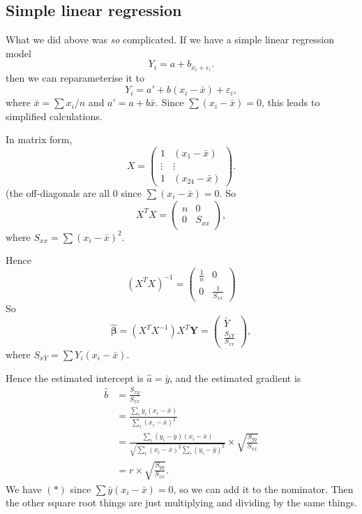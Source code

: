\documentclass[a4paper]{article}
\begin{document}
\subsection{Simple linear regression}
What we did above was \emph{so} complicated. If we have a simple linear regression model
\[
  Y_i = a + b_{x_i + \varepsilon_i}.
\]
then we can reparameterise it to
\[
  Y_i = a' + b(x_i - \bar x) + \varepsilon_i,\tag{6}
\]
where $\bar x = \sum x_i/n$ and $a' = a + b\bar x$. Since $\sum (x_i - \bar x) = 0$, this leads to simplified calculations.

In matrix form,
\[
  X =
  \begin{pmatrix}
    1 & (x_1 - \bar x)\\
    \vdots & \vdots \\
    1 & (x_{24} - \bar x)
  \end{pmatrix}.
\]
(the off-diagonals are all 0 since $\sum (x_i - \bar x) = 0$. So
\[
  X^TX =
  \begin{pmatrix}
    n & 0\\
    0 & S_{xx}
  \end{pmatrix},
\]
where $S_{xx} = \sum (x_i - \bar x)^2$.

Hence
\[
  (X^TX)^{-1} =
  \begin{pmatrix}
    \frac{1}{n} & 0\\
    0 & \frac{1}{S_{xx}}
  \end{pmatrix}
\]
So
\[
  \hat{\boldsymbol\beta} = (X^TX^{-1})X^T \mathbf{Y} =
  \begin{pmatrix}
    \bar Y \\
    \frac{S_{xY}}{S_{xx}}
  \end{pmatrix},
\]
where $S_{xY} = \sum Y_i(x_i - \bar x)$.

Hence the estimated intercept is $\hat{a} = \bar y$, and the estimated gradient is
\begin{align*}
  \hat{b} &= \frac{S_{xy}}{S_{xx}}\\
  &= \frac{\sum_i y_i(x_i - \bar x)}{\sum_i (x_i - \bar x)^2}\\
  &= \frac{\sum_i (y_i - \bar y)(x_i - \bar x)}{\sqrt{\sum_i (x_i - \bar x)^2\sum_i (y_i - \bar y)^2}}\times \sqrt{\frac{S_{yy}}{S_{xx}}}\tag{$*$}\\
  &= r \times \sqrt{\frac{S_{yy}}{S_{xx}}}.
\end{align*}
We have $(*)$ since $\sum \bar y(x_i - \bar x) = 0$, so we can add it to the nominator. Then the other square root things are just multiplying and dividing by the same things.
\end{document}
